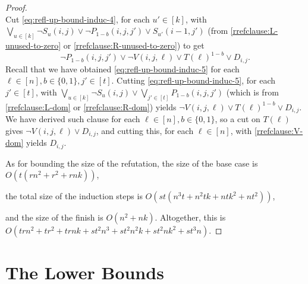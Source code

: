 \documentclass[10pt,a4paper]{article}
\theoremstyle{remark}
\newtheorem*{switching lemma}{Switching Lemma}
\newtheorem*{open problem}{Open Problem}
\theoremstyle{definition}
\begin{document}
\begin{proof}
\begin{equation}
\end{equation}
Cut \eqref{eq:refl-up-bound-induc-4}, for each $u' \in [k]$, with $\bigvee_{u \in [k]} \neg S_u(i,j) \lor \neg P_{1-b}(i,j,j') \lor S_{u'}(i-1,j')$ (from \eqref{rrefclause:L-unused-to-zero} or \eqref{rrefclause:R-unused-to-zero}) to get
\begin{equation}
\label{eq:refl-up-bound-induc-5}
 \neg P_{1-b}(i,j,j') \lor \neg V(i,j,\ell) \lor T(\ell)^{1-b} \lor D_{i,j}.
\end{equation}
Recall that we have obtained \eqref{eq:refl-up-bound-induc-5} for each $\ell \in [n], b \in \{0,1\}, j' \in [t]$. Cutting \eqref{eq:refl-up-bound-induc-5}, for each $j' \in [t]$, 
with $\bigvee_{u \in [k]} \neg S_u(i,j) \lor \bigvee_{j' \in [t]} P_{1-b}(i,j,j')$ (which is from \eqref{rrefclause:L-dom} or \eqref{rrefclause:R-dom}) yields $\neg V(i,j,\ell) \lor T(\ell)^{1-b} \lor D_{i,j}$. We have derived such clause for each $\ell \in [n], b \in \{0,1\}$, so a cut on $T(\ell)$ gives $\neg V(i,j,\ell) \lor D_{i,j}$, and cutting this, for each $\ell \in [n]$, with \eqref{rrefclause:V-dom} yields $D_{i,j}$.

As for bounding the size of the refutation, the size of the base case is $O(t(rn^2 + r^2 + rnk))$,

the total size of the induction steps is $O(st(n^3t + n^2tk + ntk^2 + nt^2 ))$, 

and the size of the finish is $O(n^2 + nk)$. Altogether, this is $O(trn^2 + tr^2 + trnk + st^2n^3 + st^2n^2k + st^2nk^2 + st^3n)$.
\end{proof}



\section{The Lower Bounds}
\label{sec:res2-no-wfdp}
\end{document}
